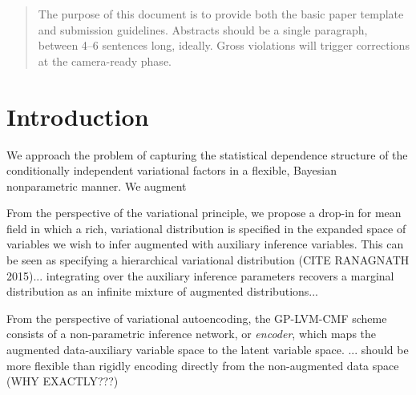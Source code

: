 \documentclass{article}
\begin{document}

\begin{abstract}
The purpose of this document is to provide both the basic paper template and
submission guidelines. Abstracts should be a single paragraph, between 4--6 sentences long, ideally.  Gross violations will trigger corrections at the camera-ready phase.
\end{abstract}

\section{Introduction}
\label{sec:intro}

We approach the problem of capturing the statistical dependence structure of the conditionally independent variational factors in a flexible, Bayesian nonparametric manner. We augment


From the perspective of the variational principle, we propose a drop-in for mean field in which a rich, variational distribution is specified in the expanded space of variables we wish to infer augmented with auxiliary inference variables. This can be seen as specifying a hierarchical variational distribution (CITE RANAGNATH 2015)... integrating over the auxiliary inference parameters recovers a marginal distribution as an infinite mixture of augmented distributions...

From the perspective of variational autoencoding, the GP-LVM-CMF scheme consists of a non-parametric inference network, or \emph{encoder}, which maps the augmented data-auxiliary variable space to the latent variable space. ... should be more flexible than rigidly encoding directly from the non-augmented data space (WHY EXACTLY???)
\end{document}
